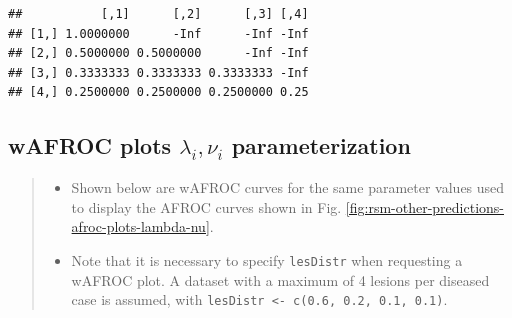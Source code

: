 \documentclass[
]{book}
\newenvironment{Shaded}{\begin{snugshade}}{\end{snugshade}}
\newcommand{\CommentTok}[1]{\textcolor[rgb]{0.56,0.35,0.01}{\textit{#1}}}
\newcommand{\ControlFlowTok}[1]{\textcolor[rgb]{0.13,0.29,0.53}{\textbf{#1}}}
\newcommand{\DataTypeTok}[1]{\textcolor[rgb]{0.13,0.29,0.53}{#1}}
\newcommand{\DecValTok}[1]{\textcolor[rgb]{0.00,0.00,0.81}{#1}}
\newcommand{\KeywordTok}[1]{\textcolor[rgb]{0.13,0.29,0.53}{\textbf{#1}}}
\newcommand{\NormalTok}[1]{#1}
\newcommand{\OperatorTok}[1]{\textcolor[rgb]{0.81,0.36,0.00}{\textbf{#1}}}
\newcommand{\StringTok}[1]{\textcolor[rgb]{0.31,0.60,0.02}{#1}}
\providecommand{\tightlist}{%
  \setlength{\itemsep}{0pt}\setlength{\parskip}{0pt}}
\begin{document}
\begin{verbatim}
##           [,1]      [,2]      [,3] [,4]
## [1,] 1.0000000      -Inf      -Inf -Inf
## [2,] 0.5000000 0.5000000      -Inf -Inf
## [3,] 0.3333333 0.3333333 0.3333333 -Inf
## [4,] 0.2500000 0.2500000 0.2500000 0.25
\end{verbatim}

\hypertarget{wafroc-plots-lambda_i-nu_i-parameterization}{%
\subsection{\texorpdfstring{wAFROC plots \(\lambda_i, \nu_i\) parameterization}{wAFROC plots \textbackslash lambda\_i, \textbackslash nu\_i parameterization}}\label{wafroc-plots-lambda_i-nu_i-parameterization}}

\begin{quote}
\begin{itemize}
\tightlist
\item
  Shown below are wAFROC curves for the same parameter values used to display the AFROC curves shown in Fig. \ref{fig:rsm-other-predictions-afroc-plots-lambda-nu}.
\item
  Note that it is necessary to specify \texttt{lesDistr} when requesting a wAFROC plot. A dataset with a maximum of 4 lesions per diseased case is assumed, with \texttt{lesDistr\ \textless{}-\ c(0.6,\ 0.2,\ 0.1,\ 0.1)}.
\end{itemize}
\end{quote}

\begin{Shaded}
\end{Shaded}
\end{document}
